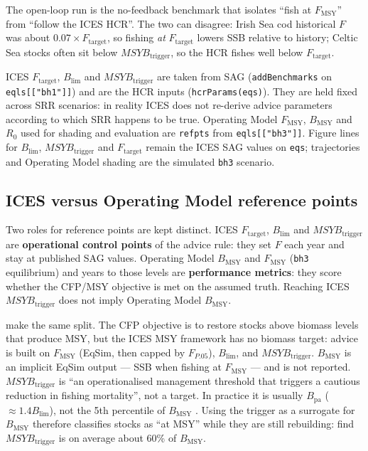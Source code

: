 \documentclass[11pt,a4paper]{article}
\newcommand{\Fmsy}{F_{\mathrm{MSY}}}
\newcommand{\Blim}{B_{\lim}}
\newcommand{\Btrig}{MSYB_{\mathrm{trigger}}}
\newcommand{\Bmsy}{B_{\mathrm{MSY}}}
\newcommand{\Ftar}{F_{\mathrm{target}}}
\begin{document}
The open-loop run is the no-feedback benchmark that isolates ``fish at
$\Fmsy$'' from ``follow the ICES HCR''. The two can disagree: Irish Sea
cod historical $F$ was about $0.07\times F_{\mathrm{target}}$, so fishing
\emph{at} $F_{\mathrm{target}}$ lowers SSB relative to history; Celtic
Sea stocks often sit below $\Btrig$, so the HCR fishes well below
$F_{\mathrm{target}}$.

ICES $\Ftar$, $\Blim$ and $\Btrig$ are taken from SAG
(\texttt{addBenchmarks} on \texttt{eqls[["bh1"]]}) and are the HCR
inputs (\texttt{hcrParams(eqs)}). They are held fixed across SRR
scenarios: in reality ICES does not re-derive advice parameters according
to which SRR happens to be true. Operating Model $\Fmsy$, $\Bmsy$ and
$R_0$ used for shading and evaluation are \texttt{refpts} from
\texttt{eqls[["bh3"]]}. Figure lines for $\Blim$, $\Btrig$ and
$F_{\mathrm{target}}$ remain the ICES SAG values on \texttt{eqs};
trajectories and Operating Model shading are the simulated
\texttt{bh3} scenario.

\subsection{ICES versus Operating Model reference points}
\label{sec:refpts}

Two roles for reference points are kept distinct.
ICES $\Ftar$, $\Blim$ and $\Btrig$ are \textbf{operational control
points} of the advice rule: they set $F$ each year and stay at published
SAG values. Operating Model $\Bmsy$ and $\Fmsy$ (\texttt{bh3}
equilibrium) and years to those levels are \textbf{performance metrics}:
they score whether the CFP/MSY objective is met on the assumed truth.
Reaching ICES $\Btrig$ does not imply Operating Model $\Bmsy$.

\citet{winker2026rebuilding} make the same split. The CFP objective is
to restore stocks above biomass levels that produce MSY, but the ICES
MSY framework has no biomass target: advice is built on $\Fmsy$ (EqSim,
then capped by $F_{P.05}$), $\Blim$, and $MSYB_{\mathrm{trigger}}$.
$\Bmsy$ is an implicit EqSim output --- SSB when fishing at $\Fmsy$ ---
and is not reported. $MSYB_{\mathrm{trigger}}$ is ``an operationalised
management threshold that triggers a cautious reduction in fishing
mortality'', not a target. In practice it is usually $B_{\mathrm{pa}}$
($\approx 1.4\Blim$), not the 5th percentile of $\Bmsy$
\citep{winker2026rebuilding,winker2025precautionary}. Using the trigger
as a surrogate for $\Bmsy$ therefore classifies stocks as ``at MSY''
while they are still rebuilding: \citet{winker2026rebuilding} find
$MSYB_{\mathrm{trigger}}$ is on average about 60\% of $\Bmsy$.
\end{document}
